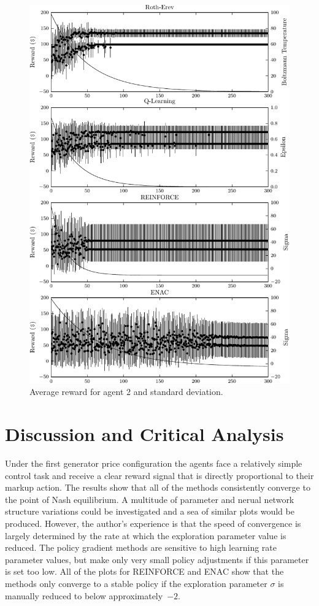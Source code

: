 {\begin{figure}
	  \includegraphics{figures/fig5_2_reward_a2}
	  \caption{Average reward for agent 2 and standard deviation.}
	  \label{fig:5_2_reward_a2}
	\end{figure}
}{}

\section{Discussion and Critical Analysis}
Under the first generator price configuration the agents face a
relatively simple control task and receive a clear reward signal that is
directly proportional to their markup action.  The results show that all of the methods consistently
converge to the point of Nash equilibrium.  A multitude of parameter and nerual
network structure variations could be investigated and a sea of similar
plots would be produced.  However, the author's experience is that the speed of
convergence is largely determined by the rate at which the exploration parameter value is reduced.
The policy gradient methods are sensitive to high learning rate parameter
values, but make only very small policy adjustments if this parameter is set
too low. All of the plots for REINFORCE and ENAC show that the methods only converge to a
stable policy if the exploration parameter $\sigma$ is manually reduced to
below approximately~$-2$.

